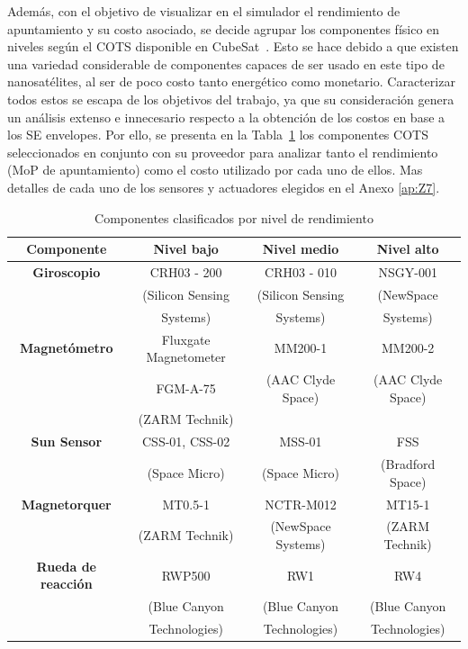 Además, con el objetivo de visualizar en el simulador el rendimiento de apuntamiento y su costo asociado, se decide agrupar los componentes físico en niveles según el COTS disponible en CubeSat~\cite{ref45}. Esto se hace debido a que existen una variedad considerable de componentes capaces de ser usado en este tipo de nanosatélites, al ser de poco costo tanto energético como monetario. Caracterizar todos estos se escapa de los objetivos del trabajo, ya que su consideración genera un análisis extenso e innecesario respecto a la obtención de los costos en base a los SE envelopes. Por ello, se presenta en la Tabla~\ref{tab:niveles} los componentes COTS seleccionados en conjunto con su proveedor para analizar tanto el rendimiento (MoP de apuntamiento) como el costo utilizado por cada uno de ellos. Mas detalles de cada uno de los sensores y actuadores elegidos en el Anexo \ref{ap:Z7}.

\begin{table}[h!]
	\centering
	\caption{Componentes clasificados por nivel de rendimiento}
	\begin{tabular}{|c|c|c|c|}
		\hline
		\textbf{Componente}   & \textbf{Nivel bajo} & \textbf{Nivel medio} & \textbf{Nivel alto} \\ 
		\hline
		\textbf{Giroscopio}   & CRH03 - 200  & CRH03 - 010  & NSGY-001   \\
		& (Silicon Sensing  & (Silicon Sensing & (NewSpace \\
		& Systems) & Systems) & Systems) \\
		\hline
		\textbf{Magnetómetro} & Fluxgate Magnetometer & MM200-1 & MM200-2  \\
		& FGM-A-75 & (AAC Clyde Space) & (AAC Clyde Space) \\
		& (ZARM Technik) & & \\
		\hline
		\textbf{Sun Sensor}   & CSS-01, CSS-02  & MSS-01 & FSS  \\
		& (Space Micro)   & (Space Micro) & (Bradford Space) \\
		\hline
		\textbf{Magnetorquer} & MT0.5-1 & NCTR-M012 & MT15-1 \\
		& (ZARM Technik) & (NewSpace Systems) & (ZARM Technik) \\
		\hline
		\textbf{Rueda de reacción} & RWP500 & RW1  & RW4  \\
		& (Blue Canyon & (Blue Canyon & (Blue Canyon \\
		& Technologies) & Technologies) & Technologies) \\
		\hline
	\end{tabular}
	\label{tab:niveles}
\end{table}


